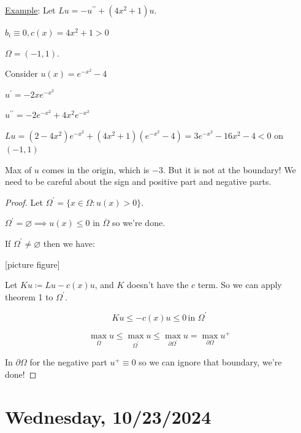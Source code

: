 \documentclass{article}
\theoremstyle{definition}
\begin{document}
\underline{Example}: Let \(Lu = - u^{\prime\prime} + (4x^2 + 1)u\).

\(b_i \equiv 0, c(x) = 4x^2 + 1 > 0\) 

\(\Omega = (-1,1)\).

Consider \(u(x) = e^{-x^2} - 4\)

\(u^{\prime} = -2x e^{-x^2}\)

\(u^{\prime\prime} = -2 e^{-x^2} + 4x^2 e^{-x^2}\) 

\(L u =(2-4x^2)e^{-x^2} + (4x^2 + 1)(e^{-x^2} - 4) = 3 e^{-x^2} - 16x^2 - 4 < 0 \) on \((-1,1)\) 

Max of \(u\) comes in the origin, which is \(-3\). But it is not at the boundary! We need to be careful about the sign and positive part and negative parts.

\begin{proof}
    Let \(\Omega ^{\prime} = \{ x\in \Omega : u(x) > 0 \}\).

    \(\Omega ^{\prime} = \varnothing \implies u(x) \leq 0\) in \(\overline{\Omega}\) so we're done.

    If \(\Omega ^{\prime} \neq \varnothing\) then we have:

    [picture figure]

    Let \(Ku \coloneqq L u - c(x)u\), and \(K\) doesn't have the \(c\) term. So we can apply theorem 1 to \(\Omega ^{\prime} \). 

    \[
        Ku \leq - c(x) u \leq 0 \, \text{in } \Omega ^{\prime} 
    \]

    \[
        \max_{\overline{\Omega}} u \leq \max_{\overline{\Omega^{\prime}}} u \leq \max_{\partial \Omega ^{\prime}} u = \max_{\partial \Omega} u^+ 
    \]

    In \(\partial \Omega\) for the negative part \(u^+ \equiv 0\) so we can ignore that boundary, we're done!

\end{proof}

\section*{Wednesday, 10/23/2024}
\end{document}
